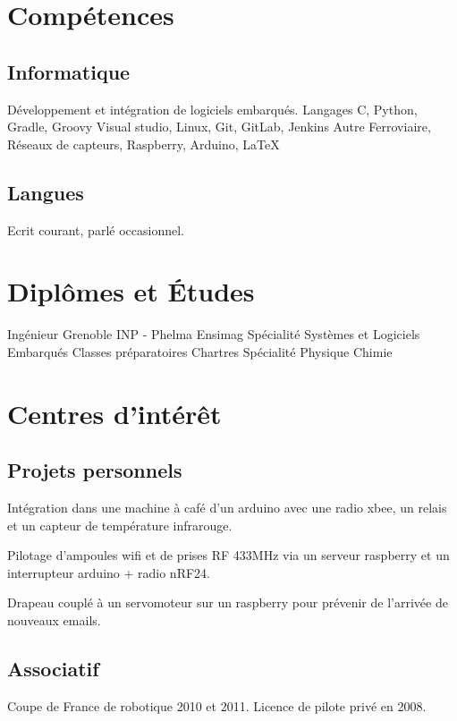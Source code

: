 \documentclass[10pt,a4paper]{moderncv}
\begin{document}
\section{Compétences}

  \subsection{Informatique}

    {\small Développement et intégration de logiciels embarqués.\newline{}}
    {Langages}
    {\small C, Python, Gradle, Groovy}
    {\small Visual studio, Linux, Git, GitLab, Jenkins\newline{}}
    {Autre}
    {\small Ferroviaire, Réseaux de capteurs, Raspberry, Arduino, \LaTeX} 

  \subsection{Langues}

    {\small Ecrit courant, parlé occasionnel.\newline{}}

\section{Diplômes et Études}
  {Ingénieur Grenoble INP - Phelma Ensimag}
  {}
  {}
  {}
  {Spécialité Systèmes et Logiciels Embarqués\newline{}}
  {Classes préparatoires}
  {}
  {}
  {Chartres}
  {Spécialité Physique Chimie\newline{}}

\section{Centres d'intérêt}
  \subsection{Projets personnels}
    {\small Intégration dans une machine à café d'un arduino avec une radio xbee, un relais et un capteur de température infrarouge.}

    {\small Pilotage d'ampoules wifi et de prises RF 433MHz via un serveur raspberry et un interrupteur arduino + radio nRF24.}

    {\small Drapeau couplé à un servomoteur sur un raspberry pour prévenir de l'arrivée de nouveaux emails.\newline{}}

  \subsection{Associatif}
    {\small Coupe de France de robotique 2010 et 2011.\newline{}}
    {\small Licence de pilote privé en 2008.}
\end{document}
